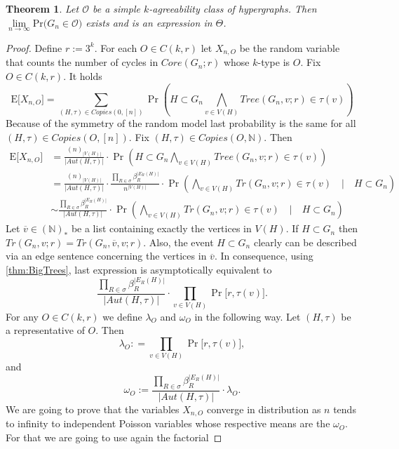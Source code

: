 \documentclass[12pt,notitlepage,a4paper]{article}
\newtheorem{theorem}{Theorem}[section]
\theoremstyle{definition}
\newcommand{\N}{\mathbb{N}}
\newcommand{\Ln}{\lim\limits_{n\to \infty}}
\newcommand{\PR}[1]{\mathrm{Pr}\big(#1\big)}
\begin{document}
\begin{theorem}\label{thm:agreeabilityprobabilities}
	Let $\mathcal{O}$ be a simple $k$-agreeability class
	of hypergraphs. Then 
	$\Ln \PR{G_n\in \mathcal{O}}$ exists and is an expression
	in $\Theta$. 
\end{theorem}
\begin{proof}
	Define $r:=3^k$. 
	For each $O\in C(k,r)$ let $X_{n,O}$ be the random variable
	that counts the number of cycles in $Core(G_n;r)$ 
	whose $k$-type is $O$. Fix $O\in C(k,r)$. It holds
	\[
	\mathrm{E}\big[ X_{n,O}\big]
	=\sum_{(H,\tau)\in Copies(0,[n])} \Pr\left(
	H\subset G_n \bigwedge_{v\in V(H)} 
	Tree(G_n, v;r)\in \tau(v)
	\right)	
	\]
	Because of the symmetry of the random model last probability is the 
	same for all $(H,\tau)\in Copies(O,[n])$. Fix $(H,\tau)\in
	Copies(O,\N )$. Then
	\begin{align*}
	\mathrm{E}\big[ X_{n,O}\big]
	&=\frac{(n)_{|V(H)|}}{|Aut(H,\tau)|} 
	\cdot \Pr\left(
	H\subset G_n \bigwedge_{v\in V(H)} 
	Tree(G_n, v;r)\in \tau(v)
	\right)	\\
	&=\frac{(n)_{|V(H)|}}{|Aut(H,\tau)|}\cdot
	\frac{\prod_{R\in \sigma} \beta_R^{|E_R(H)|}}{n^{|V(H)|}}\cdot
	\Pr\left(\bigwedge_{v\in V(H)} 
	Tr(G_n, v;r)\in \tau(v)
	\quad  \Big| \quad H\subset G_n
	\right)\\
	&\sim 
	\frac{\prod_{R\in \sigma} \beta_R^{|E_R(H)|}}
	{|Aut(H,\tau)|}\cdot
	\Pr\left(\bigwedge_{v\in V(H)} 
	Tr(G_n, v;r)\in \tau(v)
	\quad  \Big| \quad H\subset G_n
	\right)
	\end{align*}
	Let $\overline{v}\in (\N)_*$ be a list containing 
	exactly the vertices in $V(H)$. If $H\subset G_n$
	then $Tr(G_n, v;r)=Tr(G_n,\overline{v},v;r)$. Also,
	the event $H\subset G_n$ clearly can be described via
	an edge sentence concerning the vertices in $\overline{v}$.
	In consequence, using \cref{thm:BigTrees}, last expression
	is asymptotically equivalent to
	\[
	\frac{\prod_{R\in \sigma} \beta_R^{|E_R(H)|}}
	{|Aut(H,\tau)|}\cdot
	\prod_{v\in V(H)}
	\Pr \big[ r, \tau(v) \big].
	\]
	For any $O\in C(k,r)$ we define $\lambda_O$ and 
	$\omega_O$ in the following way. Let $(H,\tau)$ be
	a representative of $O$. Then
	\[ 
	\lambda_O:
	=\prod_{v\in V(H)}
	\Pr \big[ r, \tau(v) \big],
	\]
	and
	\[
	\omega_O:=
	\frac{\prod_{R\in \sigma} \beta_R^{|E_R(H)|}}
	{|Aut(H,\tau)|}\cdot\lambda_O.
	\]
	We are going to prove that the variables $X_{n,O}$ converge
	in distribution as $n$ tends to infinity to 
	independent Poisson variables whose respective means are
	the $\omega_O$. For that we are going to use again the factorial 

\end{proof}
\end{document}
